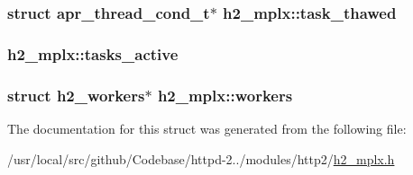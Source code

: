 \subsubsection[{\texorpdfstring{task\+\_\+thawed}{task_thawed}}]{\setlength{\rightskip}{0pt plus 5cm}struct {\bf apr\+\_\+thread\+\_\+cond\+\_\+t}$\ast$ h2\+\_\+mplx\+::task\+\_\+thawed}\hypertarget{structh2__mplx_adc48b71917bc52918f064f8c3e10ab00}{}\label{structh2__mplx_adc48b71917bc52918f064f8c3e10ab00}
\subsubsection[{\texorpdfstring{tasks\+\_\+active}{tasks_active}}]{ h2\+\_\+mplx\+::tasks\+\_\+active}\hypertarget{structh2__mplx_a8d141fea6adae0c6fc8dcf262fd39803}{}\label{structh2__mplx_a8d141fea6adae0c6fc8dcf262fd39803}
\subsubsection[{\texorpdfstring{workers}{workers}}]{\setlength{\rightskip}{0pt plus 5cm}struct {\bf h2\+\_\+workers}$\ast$ h2\+\_\+mplx\+::workers}\hypertarget{structh2__mplx_a58bdd2bc9b732ee0c064c39fc9b75743}{}\label{structh2__mplx_a58bdd2bc9b732ee0c064c39fc9b75743}


The documentation for this struct was generated from the following file\+:\begin{DoxyCompactItemize}
\item 
/usr/local/src/github/\+Codebase/httpd-\/2../modules/http2/\hyperlink{h2__mplx_8h}{h2\+\_\+mplx.\+h}\end{DoxyCompactItemize}
